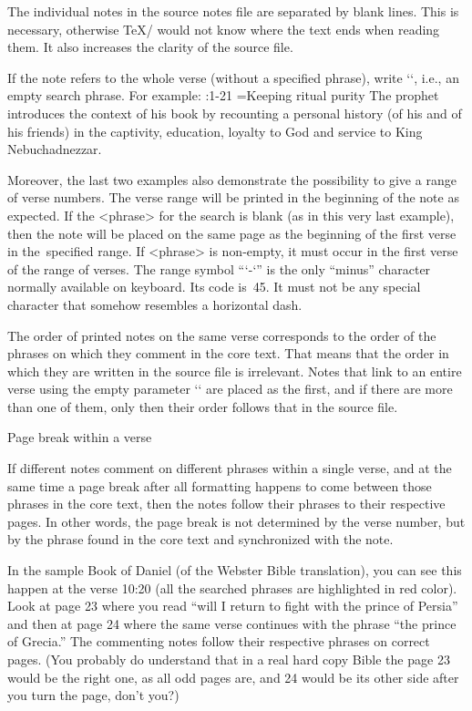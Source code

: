 {The individual notes in the source notes file are separated by blank
lines. This is necessary, otherwise \TeX/ would not know where the text ends when reading them. 
It also increases the clarity of the source file. 

If the note refers to the whole verse (without a specified phrase), write
`{}`, i.e., an empty search phrase. For example:
\begtt
{}:1-21 {}={Keeping ritual purity} The prophet introduces the context of his book by recounting a 
personal history (of his and of his friends) in the captivity, education, loyalty to God and service 
to King Nebuchadnezzar.
\endtt

Moreover, the last two examples also demonstrate the possibility to give a range of verse numbers.
The verse range will be printed in the beginning of the note as expected.
If the <phrase> for the search is blank (as in this very last example), then the note
will be placed on the same page as the beginning of the first verse in the~specified range.
If <phrase> is non-empty, it must occur in the first verse of the range of verses. 
The range symbol “`-`” is the only “minus” character normally available on
keyboard. Its code is~45. It must not be any special character that somehow resembles a horizontal 
dash.







The order of printed notes on the same verse corresponds to the order of the phrases on which
they comment in the core text. That means that the order in which they are written 
in the source file is irrelevant. Notes that link to an entire verse using the empty parameter `{}`  are placed as the first, and if there are more than one of them, only then their order follows that in the source file.




 Page break within a verse  

If different notes comment on different phrases within a single verse, and at the same time a page break after all formatting happens to come between those phrases in the core text, then the notes follow their phrases to their respective pages. In other words, the page break is not determined by the verse number, but by the phrase found  in the core text and synchronized with the note. 

In the sample Book of Daniel (of the Webster Bible translation), you can see this happen at the verse 10:20 
(all the searched phrases are highlighted in red color). Look at page 23
where you read “will I return to fight with the prince of Persia” and then at page 24 where the same verse continues with the phrase “the prince of Grecia.” The commenting notes follow their respective phrases on correct pages. 
(You probably do understand that in a real hard copy Bible the page 23 would be the right one, as all odd pages are, and 24 would be its other side after you turn the page, don't you?)

}
